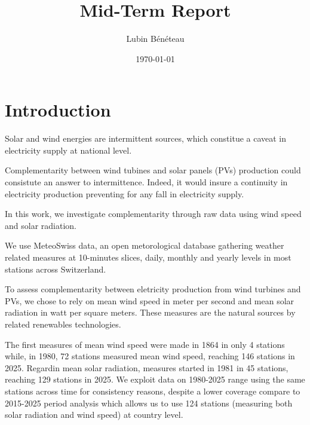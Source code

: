 \documentclass[11pt,a4paper]{article}
\title{Mid-Term Report}
\author{Lubin Bénéteau}
\date{\today}
\begin{document}
\maketitle

\section{Introduction}


Solar and wind energies are intermittent sources, which constitue a caveat in electricity supply at national level. 

Complementarity between wind tubines and solar panels (PVs) production could consistute an answer to intermittence. Indeed, it would insure a continuity in electricity production preventing for any fall in electricity supply. 

In this work, we investigate complementarity through raw data using wind speed and solar radiation.


We use MeteoSwiss data, an open metorological database gathering weather related measures at 10-minutes slices, daily, monthly and yearly levels in most stations across Switzerland.

To assess complementarity between eletricity production from wind turbines and PVs, we chose to rely on mean wind speed in meter per second and mean solar radiation in watt per square meters. These measures are the natural sources by related renewables technologies. 

The first measures of mean wind speed were made in 1864 in only 4 stations while, in 1980, 72 stations measured mean wind speed, reaching 146 stations in 2025. Regardin mean solar radiation, measures started in 1981 in 45 stations, reaching 129 stations in 2025. We exploit data on 1980-2025 range using the same stations across time for consistency reasons, despite a lower coverage compare to 2015-2025 period analysis which allows us to use 124 stations (measuring both solar radiation and wind speed) at country level. 
\end{document}
